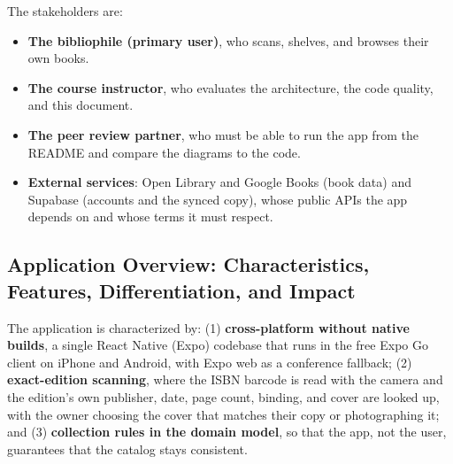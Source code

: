 \documentclass[12pt]{article}
\begin{document}
The stakeholders are:
\begin{itemize}
    \item \textbf{The bibliophile (primary user)}, who scans, shelves, and browses their own books.
    \item \textbf{The course instructor}, who evaluates the architecture, the code quality, and this document.
    \item \textbf{The peer review partner}, who must be able to run the app from the README and compare the diagrams to the code.
    \item \textbf{External services}: Open Library and Google Books (book data) and Supabase (accounts and the synced copy), whose public APIs the app depends on and whose terms it must respect.
\end{itemize}

\subsection{Application Overview: Characteristics, Features, Differentiation, and Impact}

The application is characterized by: (1) \textbf{cross-platform without native builds}, a single React Native (Expo) codebase that runs in the free Expo Go client on iPhone and Android, with Expo web as a conference fallback; (2) \textbf{exact-edition scanning}, where the ISBN barcode is read with the camera and the edition's own publisher, date, page count, binding, and cover are looked up, with the owner choosing the cover that matches their copy or photographing it; and (3) \textbf{collection rules in the domain model}, so that the app, not the user, guarantees that the catalog stays consistent.
\end{document}
